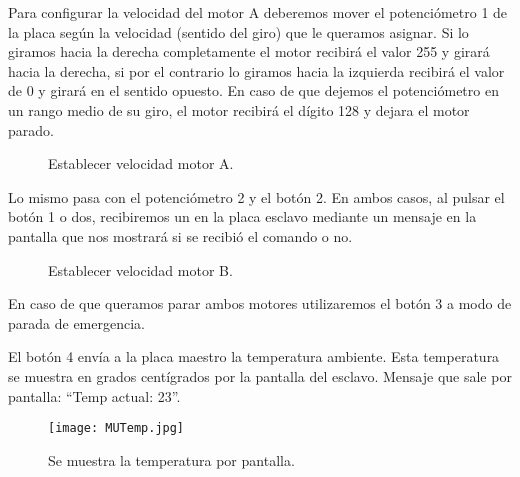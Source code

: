 \begin{description}
\item Para configurar la velocidad del motor A deberemos mover el potenciómetro 1 de la placa según la velocidad (sentido del giro) que le queramos asignar. Si lo giramos hacia la derecha completamente el motor recibirá el valor 255 y girará hacia la derecha, si por el contrario lo giramos hacia la izquierda recibirá el valor de 0 y girará en el sentido opuesto. En caso de que dejemos el potenciómetro en un rango medio de su giro, el motor recibirá el dígito 128 y dejara el motor parado.
\clearpage

\begin{figure}[!h]
 \centering
 \caption{Establecer velocidad motor A.}
 \label{MU1}
\end{figure}



\item Lo mismo pasa con el potenciómetro 2 y el botón 2. En ambos casos, al pulsar el botón 1 o dos, recibiremos un  en la placa esclavo mediante un mensaje en la pantalla que nos mostrará si se recibió el comando o no.

\begin{figure}[!h]
 \centering
 \caption{Establecer velocidad motor B.}
 \label{MU2}
\end{figure}

\item En caso de que queramos parar ambos motores utilizaremos el botón 3 a modo de parada de emergencia. 
\clearpage
\item El botón 4 envía a la placa maestro la temperatura ambiente. Esta temperatura se muestra en grados centígrados por la pantalla del esclavo. Mensaje que sale por pantalla: ``Temp actual: 23''.

\begin{figure}[!h]
	\centering
	\texttt{[image: MUTemp.jpg]}
	\caption{Se muestra la temperatura por pantalla.}
\end{figure}



\end{description}
